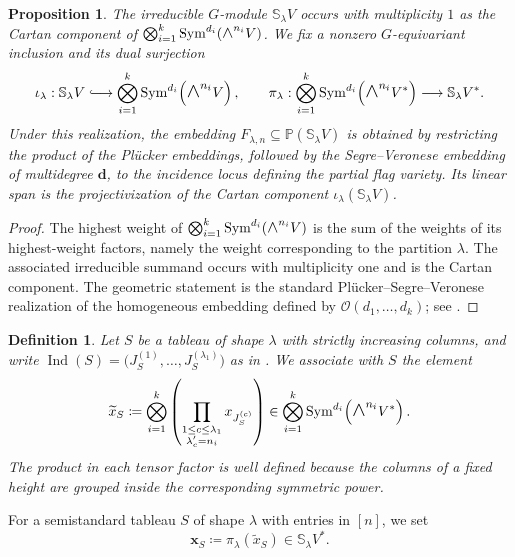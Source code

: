 \documentclass[a4paper,reqno]{amsart}
\theoremstyle{plainnopunct}
\newtheorem{proposition}[proposition]{Proposition}
\theoremstyle{definitionnopunct}
\newtheorem{definition}[definition]{Definition}
\newcommand{\superwedge}{\mathlarger{\mathlarger{\wedge}}}
\renewcommand{\P}{\mathbb{P}}
\renewcommand{\S}{\mathbb{S}}
\newcommand{\cO}{\mathcal{O}}
\newcommand{\Sym}{\operatorname{Sym}}
\newcommand{\ind}{\operatorname{Ind}}
\newcommand{\bx}{\mathbf{x}}
\newcommand{\bd}{\mathbf{d}}
\begin{document}
\begin{proposition}
\label{prop: cartan realization}
The irreducible $G$-module $\S_\lambda V$ occurs with multiplicity $1$ as the Cartan component of $\bigotimes_{i=1}^k \Sym^{d_i}\!\left(\superwedge^{n_i}V\right)$. We fix a nonzero $G$-equivariant inclusion and its dual surjection
\[\iota_\lambda:
\S_\lambda V
\lhook\joinrel\longrightarrow
\bigotimes_{i=1}^k
\Sym^{d_i}\!\left(\superwedge^{n_i}V\right),
\qquad
\pi_\lambda:
\bigotimes_{i=1}^k
\Sym^{d_i}\!\left(\superwedge^{n_i}V^*\right)
\longrightarrow
\S_\lambda V^*.
\]
Under this realization, the embedding $F_{\lambda,n} \subseteq \P(\S_\lambda V)$ is obtained by restricting the product of the Pl\"ucker embeddings, followed by the Segre--Veronese embedding of multidegree $\bd$, to the incidence locus defining the partial flag variety. Its linear span is the projectivization of the Cartan component $\iota_\lambda(\S_\lambda V)$.
\end{proposition}

\begin{proof}
The highest weight of $\bigotimes_{i=1}^k \Sym^{d_i}\!\left(\superwedge^{n_i}V\right)$ is the sum of the weights of its highest-weight factors, namely the weight corresponding to the partition $\lambda$. The associated irreducible summand occurs with multiplicity one and is the Cartan component. The geometric statement is the standard Pl\"ucker--Segre--Veronese realization of the homogeneous embedding defined by $\cO(d_1,\ldots,d_k)$; see \cite{Fulton1997,FultonHarris1991}.
\end{proof}

\begin{definition}
\label{def: tableau monomials}
Let $S$ be a tableau of shape $\lambda$ with strictly increasing columns, and write $\ind(S)
=
\bigl(
J_S^{(1)},\ldots,J_S^{(\lambda_1)}
\bigr)$ as in . We associate with $S$ the element
\[\widetilde{x}_S
\coloneq
\bigotimes_{i=1}^k
\left(
\prod_{\substack{1\leq c\leq\lambda_1\\
                  \lambda'_c=n_i}}
x_{J_S^{(c)}}
\right)
\in
\bigotimes_{i=1}^k
\Sym^{d_i}\!\left(\superwedge^{n_i}V^*\right).\]
The product in each tensor factor is well defined because the columns of a fixed height are grouped inside the corresponding symmetric power.
\end{definition}

For a semistandard tableau $S$ of shape $\lambda$ with entries in $[n]$, we set
\[\bx_S
\coloneq
\pi_\lambda\!\left(\widetilde{x}_S\right)
\in
\S_\lambda V^*.\]
\end{document}
